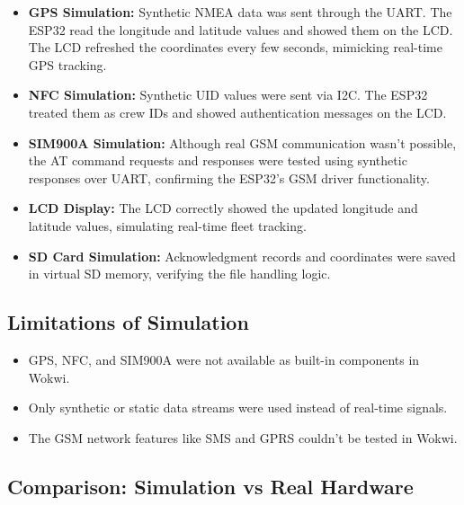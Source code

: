 \begin{itemize}
    \item \textbf{GPS Simulation:} Synthetic NMEA data was sent through the UART. The ESP32 read the longitude and latitude values and showed them on the LCD. The LCD refreshed the coordinates every few seconds, mimicking real-time GPS tracking.
    \item \textbf{NFC Simulation:} Synthetic UID values were sent via I2C. The ESP32 treated them as crew IDs and showed authentication messages on the LCD.
    \item \textbf{SIM900A Simulation:} Although real GSM communication wasn’t possible, the AT command requests and responses were tested using synthetic responses over UART, confirming the ESP32’s GSM driver functionality.
    \item \textbf{LCD Display:} The LCD correctly showed the updated longitude and latitude values, simulating real-time fleet tracking.
    \item \textbf{SD Card Simulation:} Acknowledgment records and coordinates were saved in virtual SD memory, verifying the file handling logic.
\end{itemize}

\subsection{Limitations of Simulation}
\begin{itemize}
    \item GPS, NFC, and SIM900A were not available as built-in components in Wokwi.
    \item Only synthetic or static data streams were used instead of real-time signals.
    \item The GSM network features like SMS and GPRS couldn’t be tested in Wokwi.
\end{itemize}

\subsection{Comparison: Simulation vs Real Hardware}
\usepackage{graphicx} %

